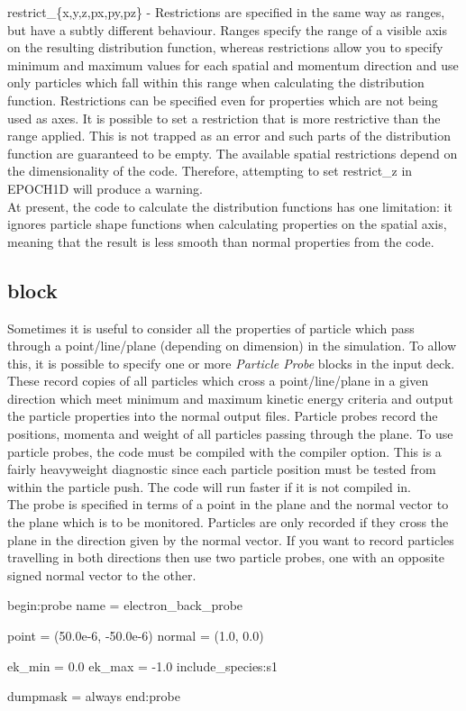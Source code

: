 {\emphtext restrict\_\{x,y,z,px,py,pz\}} - Restrictions are specified in the
  same way as ranges, but have a subtly different behaviour. Ranges specify
  the range of a visible axis on the resulting distribution function, whereas
  restrictions allow you to specify minimum and maximum values for each
  spatial and momentum direction and use only particles which fall within this
  range when calculating the distribution function. Restrictions can be
  specified even
  for properties which are not being used as axes. It is possible to set a
  restriction that is more restrictive than the range applied. This is not
  trapped as an error and such parts of the distribution function are
  guaranteed to be empty. The available spatial restrictions depend on the
  dimensionality of the code. Therefore,
  attempting to set restrict\_z in EPOCH1D will produce a warning.\\

At present, the code to calculate the distribution functions has one
limitation: it ignores particle shape functions when calculating properties
on the spatial axis, meaning that the result is less smooth than normal
properties from the code.


\subsection{ block}
\label{sec:probe_block}
Sometimes it is useful to consider all the properties of particle which pass
through a point/line/plane (depending on dimension) in the simulation. To
allow this, it is possible to specify one or more {\it Particle Probe} blocks
in the input deck. These record copies of all particles which cross a
point/line/plane in a given direction which meet minimum and maximum kinetic
energy criteria and output the particle properties into the normal output
files. Particle probes record the positions, momenta and weight of all
particles passing through the plane. To use particle probes, the code must be
compiled with the  compiler option. This is
a fairly heavyweight diagnostic since each particle position must be tested
from within the particle push. The code will run faster if it is not compiled
in.\\

The probe is specified in terms of a point in the plane and the normal
vector to the plane which is to be monitored. Particles are only recorded
if they cross the plane in the direction given by the normal vector.
If you want to record particles travelling in both directions then use two
particle probes, one with an opposite signed normal vector to the other.
{\samepage
\begin{boxverbatim}
begin:probe
   name = electron_back_probe

   point = (50.0e-6, -50.0e-6)
   normal = (1.0, 0.0)

   ek_min = 0.0
   ek_max = -1.0
   include_species:s1

   dumpmask = always
end:probe
\end{boxverbatim}
}

